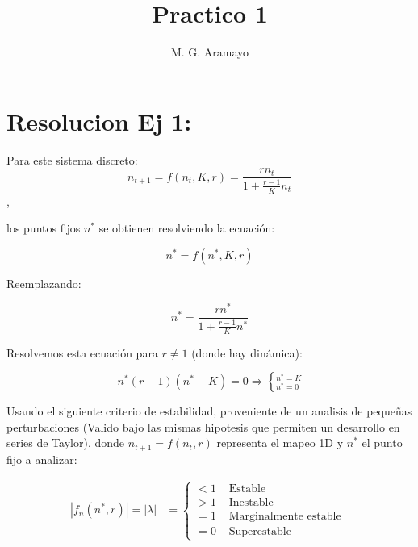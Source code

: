 \documentclass[twocolumn,aps,prl]{revtex4-1}
\newcommand{\nstar}{n^*}
\begin{document}

\title{Practico 1}
\author{M. G. Aramayo}


\maketitle



\section{Resolucion Ej 1:}

Para este sistema discreto: 
$$n_{t+1} = f(n_t, K, r)= \frac{r n_t}{1+\frac{r-1}{K} n_t}$$, 

los puntos fijos $n^*$ se obtienen resolviendo la ecuación:

$$
n^* = f(n^*, K, r)
$$

Reemplazando:

$$
\nstar = \frac{r \nstar}{1+\frac{r-1}{K} \nstar}
$$


Resolvemos esta ecuación para $r\neq 1$ (donde hay dinámica):

$$
\nstar (r-1) (\nstar-K) = 0 \Rightarrow \left\lbrace ^{\nstar = K} _{\nstar = 0}  \right .
$$

Usando el siguiente criterio de estabilidad, proveniente de un analisis de pequeñas perturbaciones (Valido bajo las mismas hipotesis que permiten un desarrollo en series de Taylor), donde $n_{t+1} = f(n_t,r)$ representa el mapeo 1D y $\nstar$ el punto fijo a analizar:

$$
\begin{aligned}
|f_{n}\left(n^{*},r\right)| = |\lambda| &=\left\{\begin{array}{ll}
<1 & \text { Estable } \\
>1 & \text { Inestable } \\
=1 & \text { Marginalmente estable } \\
=0 & \text { Superestable }
\end{array}\right.
\end{aligned}
$$
\end{document}
